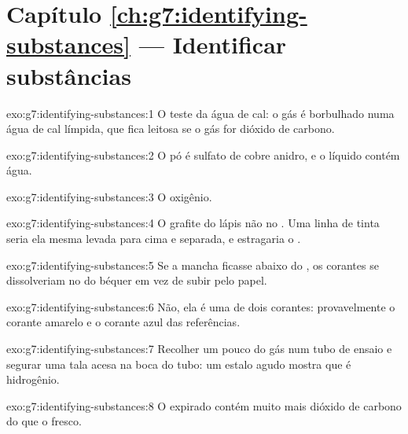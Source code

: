 \section*{Capítulo \ref{ch:g7:identifying-substances} --- Identificar substâncias}

\begin{solution}{exo:g7:identifying-substances:1}
O teste da água de cal: o gás é borbulhado numa água de cal límpida, que
fica leitosa se o gás for dióxido de carbono.
\end{solution}

\begin{solution}{exo:g7:identifying-substances:2}
O pó é sulfato de cobre anidro, e o líquido contém água.
\end{solution}

\begin{solution}{exo:g7:identifying-substances:3}
O oxigênio.
\end{solution}

\begin{solution}{exo:g7:identifying-substances:4}
O grafite do lápis não  no . Uma linha de tinta seria
ela mesma levada para cima e separada, e estragaria o .
\end{solution}

\begin{solution}{exo:g7:identifying-substances:5}
Se a mancha ficasse abaixo do , os corantes se dissolveriam no
 do béquer em vez de subir pelo papel.
\end{solution}

\begin{solution}{exo:g7:identifying-substances:6}
Não, ela é uma  de dois corantes: provavelmente o corante amarelo
e o corante azul das referências.
\end{solution}

\begin{solution}{exo:g7:identifying-substances:7}
Recolher um pouco do gás num tubo de ensaio e segurar uma tala acesa na
boca do tubo: um estalo agudo mostra que é hidrogênio.
\end{solution}

\begin{solution}{exo:g7:identifying-substances:8}
O  expirado contém muito mais dióxido de carbono do que o  fresco.
\end{solution}

